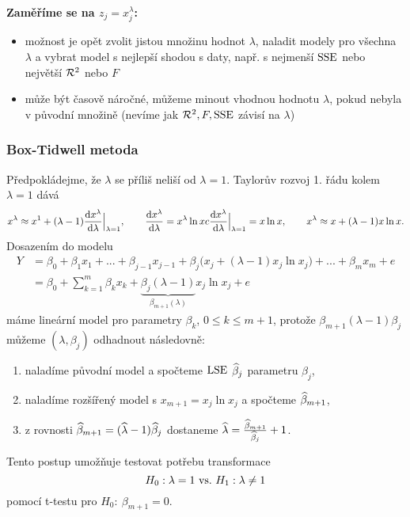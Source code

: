 \textbf{Zaměříme se na $z_j=x_j^\lambda$:}
\begin{itemize}
	\item možnost je opět zvolit jistou množinu hodnot $\lambda$, naladit modely pro všechna $\lambda$ a vybrat model s nejlepší shodou s daty, např. s nejmenší $\mathrm{SSE}$ nebo největší $\mathcal{R}^2$ nebo $F$
	\item může být časově náročné, můžeme minout vhodnou hodnotu $\lambda$, pokud nebyla v původní množině (nevíme jak $\mathcal{R}^2,F,\mathrm{SSE}$ závisí na $\lambda$)
\end{itemize}

\subsubsection*{Box-Tidwell metoda}
Předpokládejme, že $\lambda$ se příliš neliší od $\lambda=1$. Taylorův rozvoj 1. řádu kolem $\lambda=1$ dává
$$
x^\lambda\approx x^1+(\lambda-1)\frac{\mathrm{d} x^\lambda}{\mathrm{d} \lambda}\Big|_{\lambda=1},\qquad \frac{\mathrm{d} x^\lambda}{\mathrm{d} \lambda}=x^\lambda\ln x c \frac{\mathrm{d} x^\lambda}{\mathrm{d} \lambda}\Big|_{\lambda=1}=x\ln x,\qquad x^\lambda\approx x+(\lambda-1)x\ln x.
$$
Dosazením do modelu
\begin{align*}
	Y & =\beta_0+\beta_1 x_1+...+\beta_{j-1}x_{j-1}+\beta_j\big(x_j+(\lambda-1)x_j\ln x_j\big)+...+\beta_m x_m+e \\
	& =\beta_0+\sum_{k=1}^m \beta_k x_k+\underbrace{\beta_j(\lambda-1)}_{\beta_{m+1}(\lambda)}x_j\ln x_j+e
\end{align*}
máme lineární model pro parametry $\beta_k$, $0\leq k\leq m+1$, protože $\beta_{m+1}(\lambda-1)\beta_j$ můžeme $(\lambda,\beta_j)$ odhadnout následovně:
\begin{enumerate}[1)]
	\item naladíme původní model a spočteme $\mathrm{LSE}$ $\widehat{\beta}_j$ parametru $\beta_j$,
	\item naladíme rozšířený model s $x_{m+1}=x_j\ln x_j$ a spočteme $\widehat{\beta}_{m+1}$,
	\item z rovnosti $\widehat{\beta}_{m+1}=(\widehat{\lambda}-1)\widehat{\beta}_j$ dostaneme $\widehat{\lambda}=\frac{\widehat{\beta}_{m+1}}{\widehat{\beta}_j}+1$.
\end{enumerate}
Tento postup umožňuje testovat potřebu transformace
$$ H_0: \lambda=1 ~\text{vs.}~ H_1: \lambda\neq1$$
pomocí t-testu pro $H_0:~\beta_{m+1}=0$.

